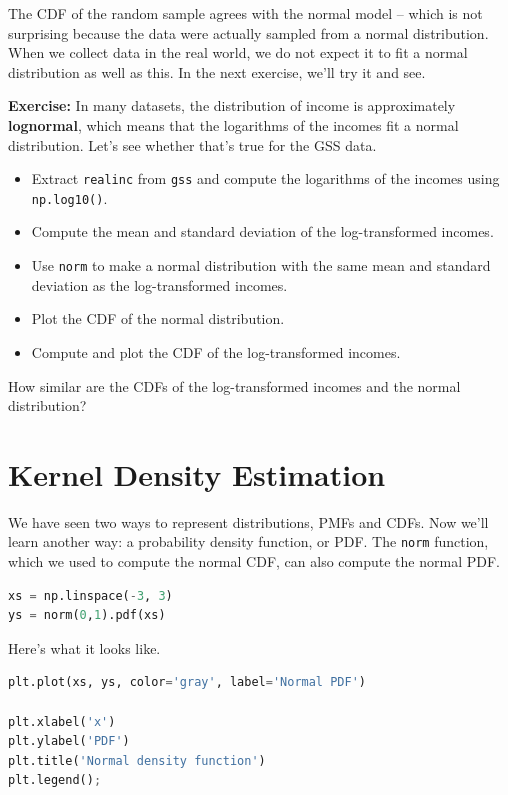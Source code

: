 The CDF of the random sample agrees with the normal model -- which is
not surprising because the data were actually sampled from a normal
distribution. When we collect data in the real world, we do not expect
it to fit a normal distribution as well as this. In the next exercise,
we'll try it and see.

\textbf{Exercise:} In many datasets, the distribution of income is
approximately \textbf{lognormal}, which means that the logarithms of the
incomes fit a normal distribution. Let's see whether that's true for the
GSS data.

\begin{itemize}
\item
  Extract \passthrough{\lstinline!realinc!} from
  \passthrough{\lstinline!gss!} and compute the logarithms of the
  incomes using \passthrough{\lstinline!np.log10()!}.
\item
  Compute the mean and standard deviation of the log-transformed
  incomes.
\item
  Use \passthrough{\lstinline!norm!} to make a normal distribution with
  the same mean and standard deviation as the log-transformed incomes.
\item
  Plot the CDF of the normal distribution.
\item
  Compute and plot the CDF of the log-transformed incomes.
\end{itemize}

How similar are the CDFs of the log-transformed incomes and the normal
distribution?

\section{Kernel Density Estimation}\label{kernel-density-estimation}

We have seen two ways to represent distributions, PMFs and CDFs. Now
we'll learn another way: a probability density function, or PDF. The
\passthrough{\lstinline!norm!} function, which we used to compute the
normal CDF, can also compute the normal PDF.

\begin{lstlisting}[language=Python,style=source]
xs = np.linspace(-3, 3)
ys = norm(0,1).pdf(xs)
\end{lstlisting}

Here's what it looks like.

\begin{lstlisting}[language=Python,style=source]
plt.plot(xs, ys, color='gray', label='Normal PDF')

plt.xlabel('x')
plt.ylabel('PDF')
plt.title('Normal density function')
plt.legend();
\end{lstlisting}

